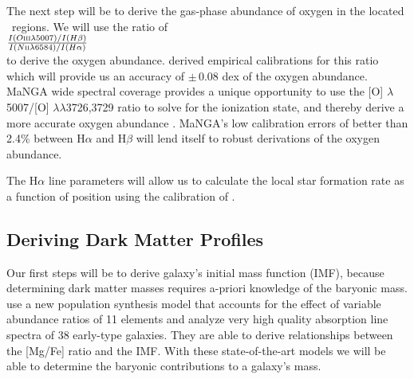 \documentclass[11pt, a4paper, onecolumn]{article}
\begin{document}
\begin{multicols}{2}
    The next step will be to derive the gas-phase abundance of oxygen in the
    located \hii\ regions. We will use the ratio of \\
    
    \begin{math} \centering
        \frac{I(O\textsc{iii} \lambda5007) / I(H\beta)}
             {I(N\textsc{ii} \lambda6584) / I(H\alpha)}
    \end{math} \\

    to derive the oxygen abundance. \citet{stasinska06} derived empirical
    calibrations for this ratio which will provide us an accuracy of
    $\pm$\,0.08 dex of the oxygen abundance. MaNGA wide spectral coverage
    provides a unique opportunity to use the [O\iii] $\lambda$5007/[O\ii]
    $\lambda\lambda$3726,3729 ratio to solve for the ionization state, and
    thereby derive a more accurate oxygen abundance \citep{lopez-sanchez12}.
    MaNGA's low calibration errors of better than 2.4\% between H$\alpha$ and
    H$\beta$ will lend itself to robust derivations of the oxygen abundance.
    
    The H$\alpha$ line parameters will allow us to calculate the local star
    formation rate as a function of position using the calibration of
    \citep{kennicutt94}.

\subsection{Deriving Dark Matter Profiles}

    Our first steps will be to derive galaxy's initial mass function (IMF),
    because determining dark matter masses requires a-priori knowledge of the
    baryonic mass. \citet{conroy12} use a new population synthesis model that
    accounts for the effect of variable abundance ratios of 11 elements and
    analyze very high quality absorption line spectra of 38 early-type
    galaxies.  They are able to derive relationships between the [Mg/Fe] ratio
    and the IMF. With these state-of-the-art models we will be able to
    determine the baryonic contributions to a galaxy's mass.


\end{multicols}
\end{document}
